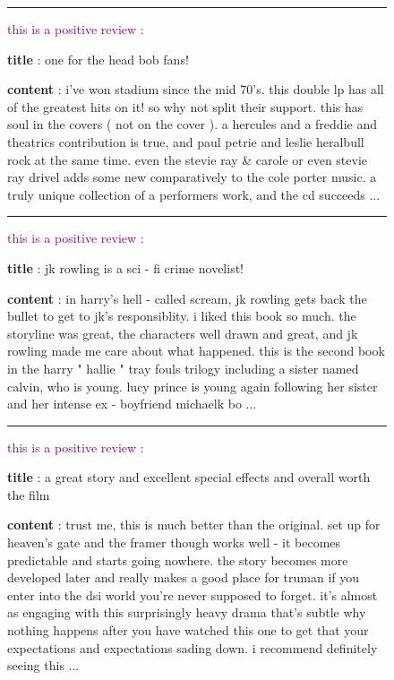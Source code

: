 \newpage
\makeatletter
\setlength{\@fptop}{0pt}   %
\makeatother
\begin{figure*}[t]
\centering
\begin{minipage}{0.9\textwidth}  %
\hrule height 0.8pt
\vspace{0.5em}
\small


\textcolor{purple}{this is a positive review :}

\textbf{title} : one for the head bob fans!

\textbf{content} : i've won stadium since the mid 70's. this double lp has all of the greatest hits on it! so why not split their support. this has soul in the covers ( not on the cover ). a hercules and a freddie and theatrics contribution is true, and paul petrie and leslie heralbull rock at the same time. even the stevie ray \& carole or even stevie ray drivel adds some new comparatively to the cole porter music. a truly unique collection of a performers work, and the cd succeeds ...

\vspace{0.5em}
\hrule
\vspace{0.5em}

\textcolor{purple}{this is a positive review :}

\textbf{title} : jk rowling is a sci - fi crime novelist!

\textbf{content} : in harry's hell - called scream, jk rowling gets back the bullet to get to jk's responsiblity. i liked this book so much. the storyline was great, the characters well drawn and great, and jk rowling made me care about what happened. this is the second book in the harry " hallie " tray fouls trilogy including a sister named calvin, who is young. lucy prince is young again following her sister and her intense ex - boyfriend michaelk bo ...

\vspace{0.5em}
\hrule
\vspace{0.5em}

\textcolor{purple}{this is a positive review : }

\textbf{title} : a great story and excellent special effects and overall worth the film

\textbf{content} : trust me, this is much better than the original. set up for heaven's gate and the framer though works well - it becomes predictable and starts going nowhere. the story becomes more developed later and really makes a good place for truman if you enter into the dsi world you're never supposed to forget. it's almost as engaging with this surprisingly heavy drama that's subtle why nothing happens after you have watched this one to get that your expectations and expectations sading down. i recommend definitely seeing this ...


\end{minipage}
\end{figure*}
